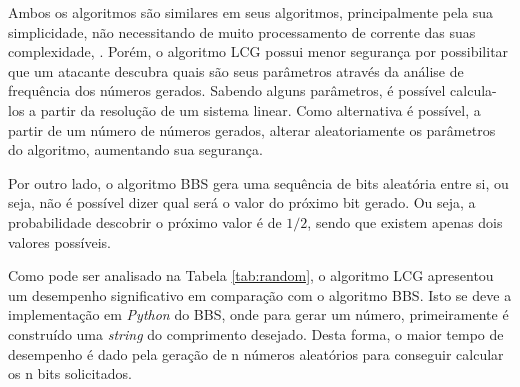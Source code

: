 \documentclass{article}
\begin{document}
Ambos os algoritmos são similares em seus algoritmos, principalmente pela sua simplicidade, não necessitando de muito processamento de corrente das suas complexidade,  .
Porém, o algoritmo LCG possui menor segurança por possibilitar que um atacante descubra quais são seus parâmetros através da análise de frequência dos números gerados.
Sabendo alguns parâmetros, é possível calcula-los a partir da resolução de um sistema linear.
Como alternativa é possível, a partir de um número de números gerados, alterar aleatoriamente os parâmetros do algoritmo, aumentando sua segurança.

Por outro lado, o algoritmo BBS gera uma sequência de bits aleatória entre si, ou seja, não é possível dizer qual será o valor do próximo bit gerado.
Ou seja, a probabilidade descobrir o próximo valor é de $1/2$, sendo que existem apenas dois valores possíveis.

Como pode ser analisado na Tabela \ref{tab:random}, o algoritmo LCG apresentou um desempenho significativo em comparação com o algoritmo BBS.
Isto se deve a implementação em \textit{Python} do BBS, onde para gerar um número, primeiramente é construído uma \textit{string} do comprimento desejado.
Desta forma, o maior tempo de desempenho é dado pela geração de n números aleatórios para conseguir calcular os n bits solicitados.

\pagebreak
\end{document}
